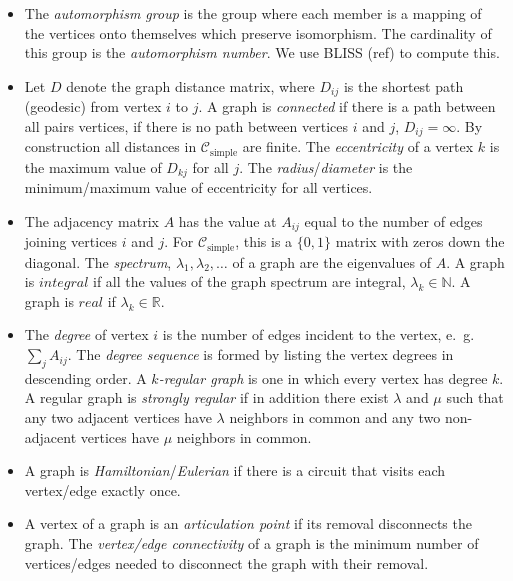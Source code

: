\documentclass[12pt]{article}
\newcommand{\SIMPLECLASS}{\mathcal{C}_\text{simple}}
\begin{document}
\begin{itemize}

\item The \textit{automorphism group} is the group where each member is a mapping of the vertices onto themselves which preserve isomorphism. The cardinality of this group is the \textit{automorphism number}.
We use BLISS (ref) to compute this.

\item Let $D$ denote the graph distance matrix, where $D_{ij}$ is the shortest path (geodesic) from vertex $i$ to $j$.
A graph is \textit{connected} if there is a path between all pairs vertices, if there is no path between vertices $i$ and $j$, $D_{ij}=\infty$.
By construction all distances in $\SIMPLECLASS$ are finite.
The \textit{eccentricity} of a vertex $k$ is the maximum value of $D_{k j}$ for all $j$.
The \textit{radius}/\textit{diameter} is the minimum/maximum value of eccentricity for all vertices.

\item The adjacency matrix $A$ has the value at $A_{ij}$ equal to the number of edges joining vertices $i$ and $j$. For $\SIMPLECLASS$, this is a $\{0,1\}$ matrix with zeros down the diagonal. The \textit{spectrum}, $\lambda_1, \lambda_2, \ldots$ of a graph are the eigenvalues of $A$. A graph is $integral$ if all the values of the graph spectrum are integral, $\lambda_k \in \mathbb{N}$. A graph is $real$ if $\lambda_k \in \mathbb{R}$.

\item The \textit{degree} of vertex $i$ is the number of edges incident to the vertex, e.\ g. $\sum_j A_{ij}$. 
The \textit{degree sequence} is formed by listing the vertex degrees in descending order.  
A \textit{$k$-regular graph} is one in which every vertex has degree $k$. 
A regular graph is \textit{strongly regular} if in addition there exist $\lambda$ and $\mu$ such that any two adjacent vertices have $\lambda$ neighbors in common and any two non-adjacent vertices have $\mu$ neighbors in common. 

\item A graph is \textit{Hamiltonian}/\textit{Eulerian} if there is a circuit that visits each vertex/edge exactly once.

\item A vertex of a graph is an \textit{articulation point} if its removal disconnects the graph. 
The \textit{vertex/edge connectivity} of a graph is the minimum number of vertices/edges needed to disconnect the graph with their removal. 


\end{itemize}
\end{document}
